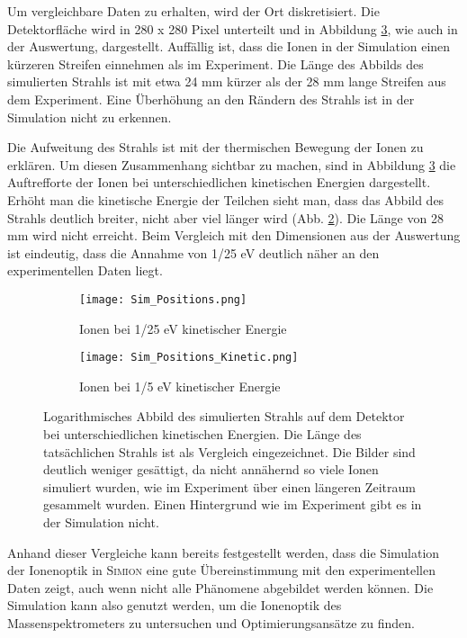 Um vergleichbare Daten zu erhalten, wird der Ort diskretisiert. Die Detektorfläche wird in 280 x 280 Pixel unterteilt und in Abbildung \ref{fig:sim_pos_both}, wie auch in der Auswertung, dargestellt. Auffällig ist, dass die Ionen in der Simulation einen kürzeren Streifen einnehmen als im Experiment. Die Länge des Abbilds des simulierten Strahls ist mit etwa 24 mm kürzer als der 28 mm lange Streifen aus dem Experiment. Eine Überhöhung an den Rändern des Strahls ist in der Simulation nicht zu erkennen.

Die Aufweitung des Strahls ist mit der thermischen Bewegung der Ionen zu erklären. Um diesen Zusammenhang sichtbar zu machen, sind in Abbildung \ref{fig:sim_pos_both} die Auftrefforte der Ionen bei unterschiedlichen kinetischen Energien dargestellt. Erhöht man die kinetische Energie der Teilchen sieht man, dass das Abbild des Strahls deutlich breiter, nicht aber viel länger wird (Abb. \ref{fig:sim_pos_kinetic}). Die Länge von 28 mm wird nicht erreicht. Beim Vergleich mit den Dimensionen aus der Auswertung ist eindeutig, dass die Annahme von 1/25 eV deutlich näher an den experimentellen Daten liegt. 

\begin{figure}
    \centering
    \begin{subfigure}{.43\textwidth}
        \centering
        \texttt{[image: Sim\_Positions.png]}
        \caption{Ionen bei 1/25 eV kinetischer Energie}
        \label{fig:sim_pos}
    \end{subfigure}%
    \hfill
    \begin{subfigure}{.45\textwidth}
        \centering
        \texttt{[image: Sim\_Positions\_Kinetic.png]}
        \caption{Ionen bei 1/5 eV kinetischer Energie}
        \label{fig:sim_pos_kinetic}
    \end{subfigure}
    \caption[Simuliertes Abbild des Strahls auf dem Detektor bei verschiedenen Energien]{Logarithmisches Abbild des simulierten Strahls auf dem Detektor bei unterschiedlichen kinetischen Energien. Die Länge des tatsächlichen Strahls ist als Vergleich eingezeichnet. Die Bilder sind deutlich weniger gesättigt, da nicht annähernd so viele Ionen simuliert wurden, wie im Experiment über einen längeren Zeitraum gesammelt wurden. Einen Hintergrund wie im Experiment gibt es in der Simulation nicht.}
    \label{fig:sim_pos_both}
\end{figure}

Anhand dieser Vergleiche kann bereits festgestellt werden, dass die Simulation der Ionenoptik in \textsc{Simion} eine gute Übereinstimmung mit den experimentellen Daten zeigt, auch wenn nicht alle Phänomene abgebildet werden können. Die Simulation kann also genutzt werden, um die Ionenoptik des Massenspektrometers zu untersuchen und Optimierungsansätze zu finden.

